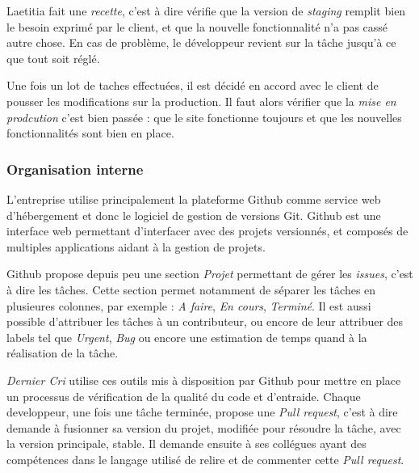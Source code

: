 \documentclass[12pt,a4paper]{article}
\begin{document}
  \bigskip

  Laetitia fait une \emph{recette}, c'est à dire vérifie que la version de
  \emph{staging} remplit bien le besoin exprimé par le client, et que la
  nouvelle fonctionnalité n'a pas cassé autre chose. En cas de problème,
  le développeur revient sur la tâche jusqu'à ce que tout soit réglé.

  \bigskip

  Une fois un lot de taches effectuées, il est décidé en accord avec le
  client de pousser les modifications sur la production. Il faut alors
  vérifier que la \emph{mise en prodcution} c'est bien passée : que le
  site fonctionne toujours et que les nouvelles fonctionnalités sont bien
  en place.

  \bigskip

  \subsubsection{Organisation interne}\label{organisation-interne}

  \bigskip

  L'entreprise utilise principalement la plateforme Github comme service
  web d'hébergement et donc le logiciel de gestion de versions Git. Github
  est une interface web permettant d'interfacer avec des projets
  versionnés, et composés de multiples applications aidant à la gestion de
  projets.

  \bigskip

  Github propose depuis peu une section \emph{Projet} permettant de gérer
  les \emph{issues}, c'est à dire les tâches. Cette section permet
  notamment de séparer les tâches en plusieures colonnes, par exemple :
  \emph{A faire}, \emph{En cours}, \emph{Terminé}. Il est aussi possible
  d'attribuer les tâches à un contributeur, ou encore de leur attribuer
  des labels tel que \emph{Urgent}, \emph{Bug} ou encore une estimation de
  temps quand à la réalisation de la tâche.

  \bigskip

  \emph{Dernier Cri} utilise ces outils mis à disposition par Github pour
  mettre en place un processus de vérification de la qualité du code et
  d'entraide. Chaque developpeur, une fois une tâche terminée, propose une
  \emph{Pull request}, c'est à dire demande à fusionner sa version du
  projet, modifiée pour résoudre la tâche, avec la version principale,
  stable. Il demande ensuite à ses collégues ayant des compétences dans le
  langage utilisé de relire et de commenter cette \emph{Pull request}.
\end{document}
